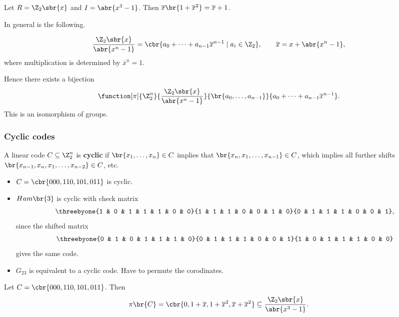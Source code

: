 \begin{example*}
Let $ R = \Z_2\sbr{x} $ and $ I = \abr{x^3 - 1} $. Then $ \overline{x}\br{1 + \overline{x}^2} = \overline{x} + 1 $.
\end{example*}

In general is the following.

\begin{proposition}
$$ \dfrac{\Z_2\sbr{x}}{\abr{x^n - 1}} = \cbr{a_0 + \dots + a_{n - 1}\overline{x}^{n - 1} \mid a_i \in \Z_2}, \qquad \overline{x} = x + \abr{x^n - 1}, $$
where multiplication is determined by $ \overline{x}^n = 1 $.
\end{proposition}

Hence there exists a bijection
$$ \function[\pi]{\Z_2^n}{\dfrac{\Z_2\sbr{x}}{\abr{x^n - 1}}}{\br{a_0, \dots, a_{n - 1}}}{a_0 + \dots + a_{n - 1}\overline{x}^{n - 1}}. $$
This is an isomorphism of groups.

\pagebreak

\subsubsection{Cyclic codes}

\begin{definition*}
A linear code $ C \subseteq \Z_2^n $ is \textbf{cyclic} if $ \br{x_1, \dots, x_n} \in C $ implies that $ \br{x_n, x_1, \dots, x_{n - 1}} \in C $, which implies all further shifts $ \br{x_{n - 1}, x_n, x_1, \dots, x_{n - 2}} \in C $, etc.
\end{definition*}

\begin{example*}
\hfill
\begin{itemize}
\item $ C = \cbr{000, 110, 101, 011} $ is cyclic.
\item $ Ham\br{3} $ is cyclic with check matrix
$$ \threebyone{1 & 0 & 1 & 1 & 1 & 0 & 0}{1 & 1 & 1 & 0 & 0 & 1 & 0}{0 & 1 & 1 & 1 & 0 & 0 & 1}, $$
since the shifted matrix
$$ \threebyone{0 & 1 & 0 & 1 & 1 & 1 & 0}{0 & 1 & 1 & 1 & 0 & 0 & 1}{1 & 0 & 1 & 1 & 1 & 0 & 0} $$
gives the same code.
\item $ G_{23} $ is equivalent to a cyclic code. Have to permute the corodinates.
\end{itemize}
\end{example*}

\begin{example*}
Let $ C = \cbr{000, 110, 101, 011} $. Then
$$ \pi\br{C} = \cbr{0, 1 + \overline{x}, 1 + \overline{x}^2, \overline{x} + \overline{x}^2} \subseteq \dfrac{\Z_2\sbr{x}}{\abr{x^3 - 1}}. $$
\end{example*}

